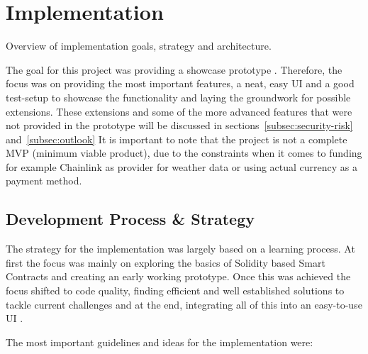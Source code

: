 \documentclass[11pt,a4paper]{article}
\begin{document}
    \section{Implementation}\label{sec:implementation}
    Overview of implementation goals, strategy and architecture.

    The goal for this project was providing a showcase prototype .
    Therefore, the focus was on providing the most important features, a neat, easy UI and a good test-setup to showcase the functionality and laying the groundwork for possible extensions.
    These extensions and some of the more advanced features that were not provided in the prototype will be discussed in sections~\ref{subsec:security-risk} and~\ref{subsec:outlook}
    It is important to note that the project is not a complete MVP (minimum viable product), due to the constraints when it comes to funding for example Chainlink as provider for weather data or using actual currency as a payment method.

    \subsection{Development Process \& Strategy}\label{subsec:dev-strategy}
    The strategy for the implementation was largely based on a learning process.
    At first the focus was mainly on exploring the basics of Solidity based Smart Contracts and creating an early working prototype.
    Once this was achieved the focus shifted to code quality, finding efficient and well established solutions to tackle current challenges and at the end, integrating all of this into an easy-to-use UI .


    The most important guidelines and ideas for the implementation were:
\end{document}
